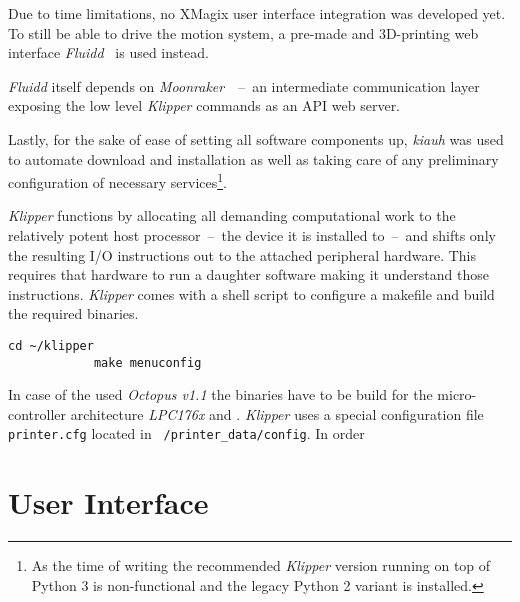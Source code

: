         Due to time limitations, no XMagix user interface integration was developed yet.
        To still be able to drive the motion system, a pre-made and 3D-printing web interface \textit{Fluidd}~\cite{Software.FluiddTheKlipperUI} is used instead.
        
        \textit{Fluidd} itself depends on \textit{Moonraker}~\cite{Software.MoonrakerAPIWebServerForKlipper.2023}~--~an intermediate communication layer exposing the low level \textit{Klipper} commands as an API web server.\par\medskip

        Lastly, for the sake of ease of setting all software components up, \textit{kiauh} was used to automate download and installation as well as taking care of any preliminary configuration of necessary services\footnote{As the time of writing the recommended \textit{Klipper} version running on top of Python 3 is non-functional and the legacy Python 2 variant is installed.}.\par\medskip

        \textit{Klipper} functions by allocating all demanding computational work to the relatively potent host processor~--~the device it is installed to~--~and shifts only the resulting I/O instructions out to the attached peripheral hardware.
        This requires that hardware to run a daughter software making it understand those instructions.
        \textit{Klipper} comes with a shell script to configure a makefile and build the required binaries.
        \begin{lstlisting}[style=mybash]
            cd ~/klipper
            make menuconfig
        \end{lstlisting}
        In case of the used \textit{Octopus v1.1} the binaries have to be build for the micro-controller architecture \textit{LPC176x} and .
        \textit{Klipper} uses a special configuration file \texttt{printer.cfg} located in \texttt{~/printer_data/config}.
        In order 
            

    \section{User Interface}
        \lipsum